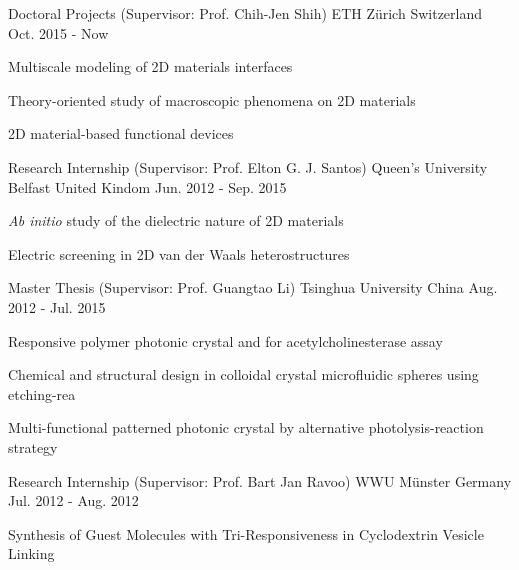 

\begin{cventries}
\cventry
{Doctoral Projects (Supervisor: Prof.  Chih-Jen Shih)} %
{ETH Z\"{u}rich} %
{Switzerland} %
{Oct. 2015 - Now} %
{
  \begin{cvitems}
  \item Multiscale modeling of 2D materials interfaces
  \item Theory-oriented study of macroscopic phenomena on 2D materials
  \item 2D material-based functional devices
  \end{cvitems}
}

\cventry
{Research Internship (Supervisor: Prof.  Elton G. J. Santos)} %
{Queen's University Belfast} %
{United Kindom} %
{Jun. 2012 - Sep. 2015} %
{
  \begin{cvitems}
  \item \textit{Ab initio} study of the dielectric nature of 2D materials
  \item Electric screening in 2D van der Waals heterostructures
  \end{cvitems}
}

\cventry
{Master Thesis (Supervisor: Prof.  Guangtao Li)}
{Tsinghua University}
{China}
{Aug. 2012 - Jul. 2015}
{
  \begin{cvitems}
  \item Responsive polymer photonic crystal and for acetylcholinesterase assay
  \item Chemical and structural design in colloidal crystal microfluidic spheres using etching-rea
  \item Multi-functional patterned photonic crystal by alternative photolysis-reaction strategy
  \end{cvitems}
}

\cventry
{Research Internship (Supervisor: Prof. Bart Jan Ravoo)} %
{WWU M\"{u}nster} %
{Germany} %
{Jul. 2012 - Aug. 2012} %
{
  \begin{cvitems}
  \item Synthesis of Guest Molecules with Tri-Responsiveness in Cyclodextrin Vesicle Linking
  \end{cvitems}
}


\end{cventries}
